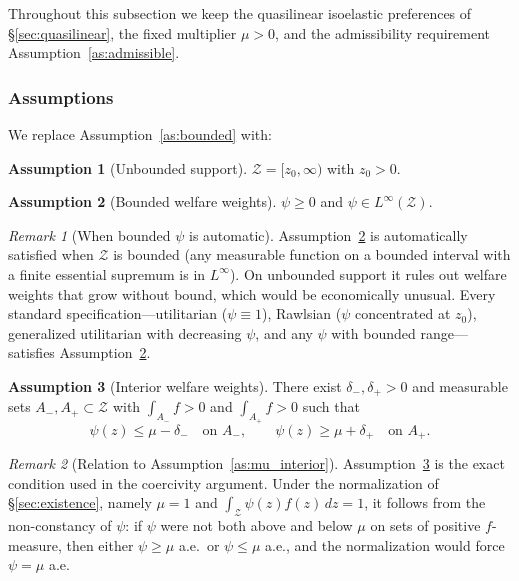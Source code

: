 \documentclass[12pt,a4paper]{article}
\theoremstyle{definition}
\newtheorem{assumption}{Assumption}[section]
\theoremstyle{plain}
\theoremstyle{remark}
\newtheorem{remark}{Remark}[section]
\newcommand{\zlow}{z_{\scriptscriptstyle 0}}
\newcommand{\calZ}{\mathcal{Z}}
\begin{document}
Throughout this subsection we keep the quasilinear isoelastic
preferences of \S\ref{sec:quasilinear}, the fixed multiplier
$\mu > 0$, and the admissibility requirement
Assumption~\ref{as:admissible}.


\subsubsection{Assumptions}

We replace Assumption~\ref{as:bounded} with:

\begin{assumption}[Unbounded support]
\label{as:unbounded_QL}
$\calZ = [\zlow, \infty)$ with $\zlow > 0$.
\end{assumption}

\begin{assumption}[Bounded welfare weights]
\label{as:psi_bounded_unbounded}
$\psi \geq 0$ and $\psi \in L^\infty(\calZ)$.
\end{assumption}

\begin{remark}[When bounded $\psi$ is automatic]
\label{rem:psi_bounded_automatic}
Assumption~\ref{as:psi_bounded_unbounded} is automatically
satisfied when $\calZ$ is bounded (any measurable function
on a bounded interval with a finite essential supremum is in
$L^\infty$).  On unbounded support it rules out welfare
weights that grow without bound, which would be economically
unusual.  Every standard specification---utilitarian
($\psi \equiv 1$), Rawlsian ($\psi$ concentrated at
$\zlow$), generalized utilitarian with decreasing $\psi$,
and any $\psi$ with bounded range---satisfies
Assumption~\ref{as:psi_bounded_unbounded}.
\end{remark}

\begin{assumption}[Interior welfare weights]
\label{as:mu_interior_unbounded}
There exist $\delta_-, \delta_+ > 0$ and measurable sets
$A_-, A_+ \subset \calZ$ with $\int_{A_-} f > 0$ and
$\int_{A_+} f > 0$ such that
\[
  \psi(z) \leq \mu - \delta_- \quad \text{on } A_-,
  \qquad
  \psi(z) \geq \mu + \delta_+ \quad \text{on } A_+.
\]
\end{assumption}

\begin{remark}[Relation to Assumption~\ref{as:mu_interior}]
\label{rem:mu_interior_unbounded}
Assumption~\ref{as:mu_interior_unbounded} is the exact condition used
in the coercivity argument.  Under the normalization of
\S\ref{sec:existence}, namely $\mu = 1$ and
$\int_{\calZ} \psi(z) f(z)\,dz = 1$, it follows from the
non-constancy of $\psi$: if $\psi$ were not both above and below
$\mu$ on sets of positive $f$-measure, then either $\psi \geq \mu$
a.e.\ or $\psi \leq \mu$ a.e., and the normalization would force
$\psi = \mu$ a.e.
\end{remark}
\end{document}
